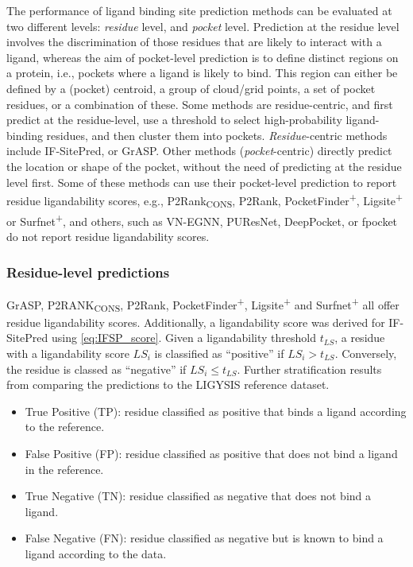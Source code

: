 The performance of ligand binding site prediction methods can be evaluated at two different levels: \textit{residue} level, and \textit{pocket} level. Prediction at the residue level involves the discrimination of those residues that are likely to interact with a ligand, whereas the aim of pocket-level prediction is to define distinct regions on a protein, i.e., pockets where a ligand is likely to bind. This region can either be defined by a (pocket) centroid, a group of cloud/grid points, a set of pocket residues, or a combination of these. Some methods are residue-centric, and first predict at the residue-level, use a threshold to select high-probability ligand-binding residues, and then cluster them into pockets. \textit{Residue}-centric methods include IF-SitePred, or GrASP. Other methods (\textit{pocket}-centric) directly predict the location or shape of the pocket, without the need of predicting at the residue level first. Some of these methods can use their pocket-level prediction to report residue ligandability scores, e.g., P2Rank\textsubscript{CONS}, P2Rank, PocketFinder\textsuperscript{+}, Ligsite\textsuperscript{+} or Surfnet\textsuperscript{+}, and others, such as VN-EGNN, PUResNet, DeepPocket, or fpocket do not report residue ligandability scores.

\subsubsection{Residue-level predictions}

GrASP, P2RANK\textsubscript{CONS}, P2Rank, PocketFinder\textsuperscript{+}, Ligsite\textsuperscript{+} and Surfnet\textsuperscript{+} all offer residue ligandability scores. Additionally, a ligandability score was derived for IF-SitePred using \autoref{eq:IFSP_score}. Given a ligandability threshold $t_{LS}$, a residue with a ligandability score $LS_{i}$ is classified as ``positive'' if $LS_{i} > t_{LS}$. Conversely, the residue is classed as ``negative'' if $LS_{i} \leq t_{LS}$. Further stratification results from comparing the predictions to the LIGYSIS reference dataset.

\begin{itemize}
\item True Positive (TP): residue classified as positive that binds a ligand according to the reference.
\item False Positive (FP): residue classified as positive that does not bind a ligand in the reference.
\item True Negative (TN): residue classified as negative that does not bind a ligand.
\item False Negative (FN): residue classified as negative but is known to bind a ligand according to the data.
\end{itemize}

